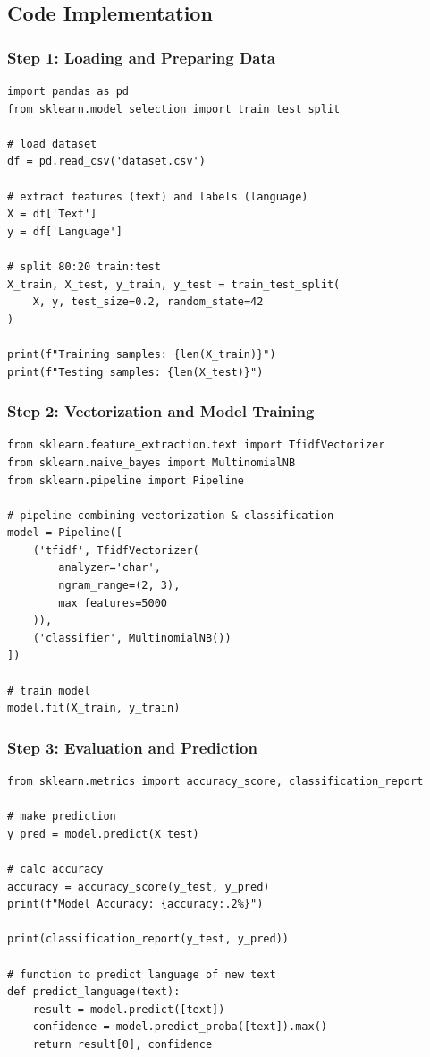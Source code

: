 \documentclass[conference]{IEEEtran}
\begin{document}
\subsection{Code Implementation}

\subsubsection{Step 1: Loading and Preparing Data}
\begin{lstlisting}
import pandas as pd
from sklearn.model_selection import train_test_split

# load dataset
df = pd.read_csv('dataset.csv')

# extract features (text) and labels (language)
X = df['Text']
y = df['Language']

# split 80:20 train:test
X_train, X_test, y_train, y_test = train_test_split(
    X, y, test_size=0.2, random_state=42
)

print(f"Training samples: {len(X_train)}")
print(f"Testing samples: {len(X_test)}")
\end{lstlisting}

\subsubsection{Step 2: Vectorization and Model Training}

\begin{lstlisting}
from sklearn.feature_extraction.text import TfidfVectorizer
from sklearn.naive_bayes import MultinomialNB
from sklearn.pipeline import Pipeline

# pipeline combining vectorization & classification
model = Pipeline([
    ('tfidf', TfidfVectorizer(
        analyzer='char',
        ngram_range=(2, 3),
        max_features=5000
    )),
    ('classifier', MultinomialNB())
])

# train model
model.fit(X_train, y_train)
\end{lstlisting}

\subsubsection{Step 3: Evaluation and Prediction}

\begin{lstlisting}
from sklearn.metrics import accuracy_score, classification_report

# make prediction
y_pred = model.predict(X_test)

# calc accuracy
accuracy = accuracy_score(y_test, y_pred)
print(f"Model Accuracy: {accuracy:.2%}")

print(classification_report(y_test, y_pred))

# function to predict language of new text
def predict_language(text):
    result = model.predict([text])
    confidence = model.predict_proba([text]).max()
    return result[0], confidence
\end{lstlisting}
\end{document}
